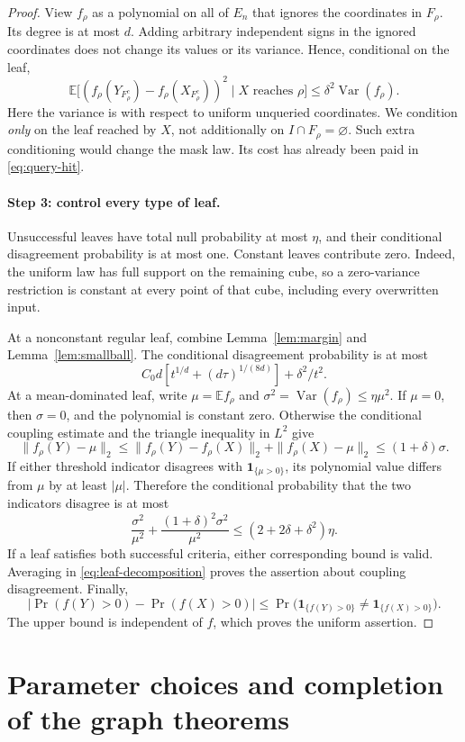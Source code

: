 \documentclass[11pt]{article}
\newcommand{\E}{\mathbb E}
\newcommand{\Var}{\operatorname{Var}}
\newcommand{\1}{\mathbf 1}
\theoremstyle{definition}
\theoremstyle{remark}
\numberwithin{equation}{section}
\begin{document}
\begin{proof}
View $f_\rho$ as a polynomial on all of $E_n$ that ignores the coordinates in $F_\rho$. Its degree is at most $d$. Adding arbitrary independent signs in the ignored coordinates does not change its values or its variance. Hence, conditional on the leaf,
\[
 \E\bigl[(f_\rho(Y_{F_\rho^c})-f_\rho(X_{F_\rho^c}))^2
          \mid X\text{ reaches }\rho\bigr]
 \le\delta^2\Var(f_\rho).
\]
Here the variance is with respect to uniform unqueried coordinates. We condition \emph{only} on the leaf reached by $X$, not additionally on $I\cap F_\rho=\varnothing$. Such extra conditioning would change the mask law. Its cost has already been paid in \eqref{eq:query-hit}.

\paragraph{Step 3: control every type of leaf.}
Unsuccessful leaves have total null probability at most $\eta$, and their conditional disagreement probability is at most one. Constant leaves contribute zero. Indeed, the uniform law has full support on the remaining cube, so a zero-variance restriction is constant at every point of that cube, including every overwritten input.

At a nonconstant regular leaf, combine Lemma~\ref{lem:margin} and Lemma~\ref{lem:smallball}. The conditional disagreement probability is at most
\[
 C_0d\left[t^{1/d}+(d\tau)^{1/(8d)}\right]+\delta^2/t^2.
\]
At a mean-dominated leaf, write $\mu=\E f_\rho$ and
$\sigma^2=\Var(f_\rho)\le\eta\mu^2$. If $\mu=0$, then $\sigma=0$, and the polynomial is constant zero. Otherwise the conditional coupling estimate and the triangle inequality in $L^2$ give
\[
 \|f_\rho(Y)-\mu\|_2
 \le\|f_\rho(Y)-f_\rho(X)\|_2+\|f_\rho(X)-\mu\|_2
 \le(1+\delta)\sigma.
\]
If either threshold indicator disagrees with $\1_{\{\mu>0\}}$, its polynomial value differs from $\mu$ by at least $|\mu|$. Therefore the conditional probability that the two indicators disagree is at most
\[
 \frac{\sigma^2}{\mu^2}
 +\frac{(1+\delta)^2\sigma^2}{\mu^2}
 \le(2+2\delta+\delta^2)\eta.
\]
If a leaf satisfies both successful criteria, either corresponding bound is valid. Averaging in \eqref{eq:leaf-decomposition} proves the assertion about coupling disagreement. Finally,
\[
 \left|\Pr(f(Y)>0)-\Pr(f(X)>0)\right|
 \le\Pr\bigl(\1_{\{f(Y)>0\}}\ne\1_{\{f(X)>0\}}\bigr).
\]
The upper bound is independent of $f$, which proves the uniform assertion.
\end{proof}

\section{Parameter choices and completion of the graph theorems}
\end{document}
